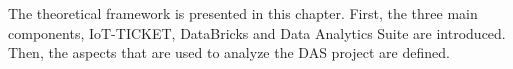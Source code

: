 The theoretical framework is presented in this chapter. First, the three main components, IoT-TICKET, DataBricks and Data Analytics Suite are introduced. Then, the aspects that are used to analyze the DAS project are defined.
